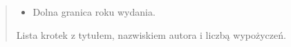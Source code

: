 \documentclass[a4paper,11pt,english,openany,oneside]{sphinxmanual}
\begin{document}
\begin{savenotes}
\begin{fulllineitems}
\begin{quote}
\begin{description}
\begin{itemize}
\item {} 
\sphinxAtStartPar
{} \textendash{} Dolna granica roku wydania.

\end{itemize}

\sphinxAtStartPar
Lista krotek z tytułem, nazwiskiem autora i liczbą wypożyczeń.

\end{description}\end{quote}

\end{fulllineitems}\end{savenotes}

\end{document}
